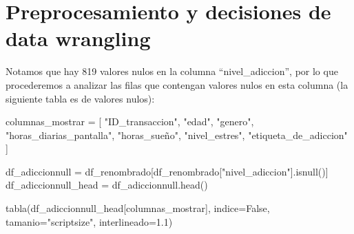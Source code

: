 \documentclass[11pt,spanish,a4paper,]{article}
\newenvironment{Shaded}{\begin{snugshade}}{\end{snugshade}}
\newcommand{\FloatTok}[1]{\textcolor[rgb]{0.68,0.00,0.00}{#1}}
\newcommand{\NormalTok}[1]{\textcolor[rgb]{0.00,0.23,0.31}{#1}}
\newcommand{\OperatorTok}[1]{\textcolor[rgb]{0.37,0.37,0.37}{#1}}
\newcommand{\StringTok}[1]{\textcolor[rgb]{0.13,0.47,0.30}{#1}}
\newcommand{\VariableTok}[1]{\textcolor[rgb]{0.07,0.07,0.07}{#1}}
\begin{document}
\section{Preprocesamiento y decisiones de data
wrangling}\label{preprocesamiento-y-decisiones-de-data-wrangling}

Notamos que hay 819 valores nulos en la columna ``nivel\_adiccion'', por
lo que procederemos a analizar las filas que contengan valores nulos en
esta columna (la siguiente tabla es de valores nulos):

\begin{Shaded}
\begin{Highlighting}[]
\NormalTok{columnas\_mostrar }\OperatorTok{=}\NormalTok{ [}
    \StringTok{"ID\_transaccion"}\NormalTok{, }\StringTok{"edad"}\NormalTok{, }\StringTok{"genero"}\NormalTok{,}
    \StringTok{"horas\_diarias\_pantalla"}\NormalTok{, }\StringTok{"horas\_sueño"}\NormalTok{,}
    \StringTok{"nivel\_estres"}\NormalTok{, }\StringTok{"etiqueta\_de\_adiccion"}
\NormalTok{]}

\NormalTok{df\_adiccionnull }\OperatorTok{=}\NormalTok{ df\_renombrado[df\_renombrado[}\StringTok{"nivel\_adiccion"}\NormalTok{].isnull()]}
\NormalTok{df\_adiccionnull\_head }\OperatorTok{=}\NormalTok{ df\_adiccionnull.head()}

\NormalTok{tabla(df\_adiccionnull\_head[columnas\_mostrar], indice}\OperatorTok{=}\VariableTok{False}\NormalTok{, tamanio}\OperatorTok{=}\StringTok{"scriptsize"}\NormalTok{, interlineado}\OperatorTok{=}\FloatTok{1.1}\NormalTok{)}
\end{Highlighting}
\end{Shaded}

\begin{table}

\caption{\label{tbl-nulos-head}Primeras filas con valores nulos en nivel
de adicción.}


\end{table}%
\end{document}
